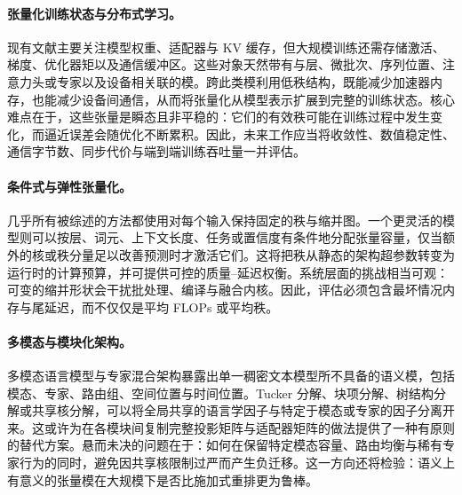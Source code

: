 \documentclass[11pt]{article}
\newcommand{\rev}[1]{\textcolor{revisionmagenta}{#1}}
\begin{document}
\paragraph{张量化训练状态与分布式学习。}
现有文献主要关注模型权重、适配器与 KV 缓存，但大规模训练还需存储激活、梯度、优化器矩以及通信缓冲区。这些对象天然带有与层、微批次、序列位置、注意力头或专家以及设备相关联的模。跨此类模利用低秩结构，既能减少加速器内存，也能减少设备间通信，从而将张量化从模型表示扩展到完整的训练状态。核心难点在于，这些张量是瞬态且非平稳的：它们的有效秩可能在训练过程中发生变化，而逼近误差会随优化不断累积。因此，未来工作应当将收敛性、数值稳定性、通信字节数、同步代价与端到端训练吞吐量一并评估。

\paragraph{条件式与弹性张量化。}
几乎所有被综述的方法都使用对每个输入保持固定的秩与缩并图。一个更灵活的模型则可以按层、词元、上下文长度、任务或置信度有条件地分配张量容量，仅当额外的核或秩分量足以改善预测时才激活它们。这将把秩从静态的架构超参数转变为运行时的计算预算，并可提供可控的质量--延迟权衡。系统层面的挑战相当可观：可变的缩并形状会干扰批处理、编译与融合内核。因此，评估必须包含最坏情况内存与尾延迟，而不仅仅是平均 FLOPs 或平均秩。

\paragraph{多模态与模块化架构。}
多模态语言模型与专家混合架构暴露出单一稠密文本模型所不具备的语义模，包括模态、专家、路由组、空间位置与时间位置。Tucker 分解、块项分解、树结构分解或共享核分解，可以将全局共享的语言学因子与特定于模态或专家的因子分离开来。这或许为在各模块间复制完整投影矩阵与适配器矩阵的做法提供了一种有原则的替代方案。悬而未决的问题在于：如何在保留特定模态容量、路由均衡与稀有专家行为的同时，避免因共享核限制过严而产生负迁移。这一方向还将检验：语义上有意义的张量模在大规模下是否比施加式重排更为鲁棒。

\end{document}
